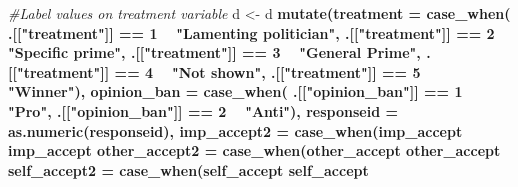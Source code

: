 \documentclass[
]{book}
\newenvironment{Shaded}{\begin{snugshade}}{\end{snugshade}}
\newcommand{\CommentTok}[1]{\textcolor[rgb]{0.56,0.35,0.01}{\textit{#1}}}
\newcommand{\DataTypeTok}[1]{\textcolor[rgb]{0.13,0.29,0.53}{#1}}
\newcommand{\DecValTok}[1]{\textcolor[rgb]{0.00,0.00,0.81}{#1}}
\newcommand{\KeywordTok}[1]{\textcolor[rgb]{0.13,0.29,0.53}{\textbf{#1}}}
\newcommand{\NormalTok}[1]{#1}
\newcommand{\OperatorTok}[1]{\textcolor[rgb]{0.81,0.36,0.00}{\textbf{#1}}}
\newcommand{\StringTok}[1]{\textcolor[rgb]{0.31,0.60,0.02}{#1}}
\begin{document}
\begin{Shaded}
\begin{Highlighting}[]
{{{{{{{{{{{{{{{{{{{{{{\CommentTok{#Label values on treatment variable}
\NormalTok{d <-}\StringTok{ }\NormalTok{d }\OperatorTok{%>%}
\StringTok{  }\KeywordTok{mutate}\NormalTok{(}\DataTypeTok{treatment =} \KeywordTok{case_when}\NormalTok{(}
\NormalTok{    .[[}\StringTok{"treatment"}\NormalTok{]] }\OperatorTok{==}\StringTok{ }\DecValTok{1} \OperatorTok{~}\StringTok{ "Lamenting politician"}\NormalTok{,}
\NormalTok{    .[[}\StringTok{"treatment"}\NormalTok{]] }\OperatorTok{==}\StringTok{ }\DecValTok{2} \OperatorTok{~}\StringTok{ "Specific prime"}\NormalTok{,}
\NormalTok{    .[[}\StringTok{"treatment"}\NormalTok{]] }\OperatorTok{==}\StringTok{ }\DecValTok{3} \OperatorTok{~}\StringTok{ "General Prime"}\NormalTok{,}
\NormalTok{    .[[}\StringTok{"treatment"}\NormalTok{]] }\OperatorTok{==}\StringTok{ }\DecValTok{4} \OperatorTok{~}\StringTok{ "Not shown"}\NormalTok{,}
\NormalTok{    .[[}\StringTok{"treatment"}\NormalTok{]] }\OperatorTok{==}\StringTok{ }\DecValTok{5} \OperatorTok{~}\StringTok{ "Winner"}\NormalTok{),}
    \DataTypeTok{opinion_ban =} \KeywordTok{case_when}\NormalTok{(}
\NormalTok{    .[[}\StringTok{"opinion_ban"}\NormalTok{]] }\OperatorTok{==}\StringTok{ }\DecValTok{1} \OperatorTok{~}\StringTok{ "Pro"}\NormalTok{,}
\NormalTok{    .[[}\StringTok{"opinion_ban"}\NormalTok{]] }\OperatorTok{==}\StringTok{ }\DecValTok{2} \OperatorTok{~}\StringTok{ "Anti"}\NormalTok{),}
    \DataTypeTok{responseid =} \KeywordTok{as.numeric}\NormalTok{(responseid),}
         \DataTypeTok{imp_accept2 =} \KeywordTok{case_when}\NormalTok{(imp_accept }\OperatorTok{%in%}\StringTok{ }\DecValTok{4}\OperatorTok{:}\DecValTok{5} \OperatorTok{~}\StringTok{ "Important"}\NormalTok{,}
\NormalTok{                                imp_accept }\OperatorTok{%in%}\StringTok{ }\DecValTok{1}\OperatorTok{:}\DecValTok{3} \OperatorTok{~}\StringTok{ "Not important"}\NormalTok{),}
         \DataTypeTok{other_accept2 =} \KeywordTok{case_when}\NormalTok{(other_accept }\OperatorTok{%in%}\StringTok{ }\DecValTok{4}\OperatorTok{:}\DecValTok{5} \OperatorTok{~}\StringTok{ "High degree"}\NormalTok{,}
\NormalTok{                                  other_accept }\OperatorTok{%in%}\StringTok{ }\DecValTok{1}\OperatorTok{:}\DecValTok{3} \OperatorTok{~}\StringTok{ "Low degree"}\NormalTok{),}
         \DataTypeTok{self_accept2 =} \KeywordTok{case_when}\NormalTok{(self_accept }\OperatorTok{%in%}\StringTok{ }\DecValTok{4}\OperatorTok{:}\DecValTok{5} \OperatorTok{~}\StringTok{ "High degree"}\NormalTok{,}
\NormalTok{                                 self_accept }\OperatorTok{%in%}\StringTok{ }\DecValTok{1}\OperatorTok{:}\DecValTok{3} \OperatorTok{~}\StringTok{ "Low degree"}\NormalTok{),}
}}}}}}}}}}}}}}}}}}}}}}}}}}}}}
\end{Highlighting}
\end{Shaded}
\end{document}
